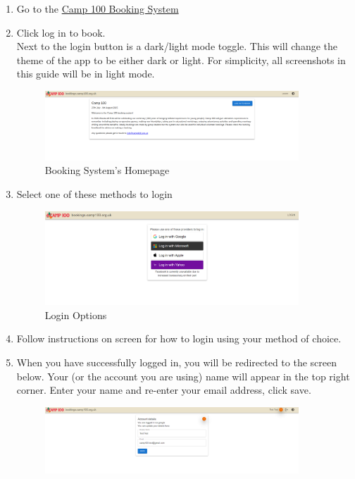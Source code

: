 \documentclass[a4paper, 11pt]{report}
\begin{document}
\begin{enumerate}
    \item Go to the \href{https://bookings.camp100.org.ukj}{Camp 100 Booking System}
    \item Click log in to book.\\
    Next to the login button is a dark/light mode toggle. This will change the theme of the app to be either dark or light. For simplicity, all screenshots in this guide will be in light mode.
    \begin{figure}[H]
        \centering
        \includegraphics[width=0.9\textwidth]{assets/1-homepage.png}
        \caption{Booking System's Homepage}
    \end{figure}
    \item Select one of these methods to login
    \begin{figure}[H]
        \centering
        \includegraphics[width=0.9\textwidth]{assets/1-login.png}
        \caption{Login Options}
    \end{figure}
    \item Follow instructions on screen for how to login using your method of choice.
    \item When you have successfully logged in, you will be redirected to the screen below. Your (or the account you are using) name will appear in the top right corner. Enter your name and re-enter your email address, click save.
    \begin{figure}[H]
        \centering
        \includegraphics[width=0.9\textwidth]{assets/1-create-account.png}

\end{figure}
\end{enumerate}
\end{document}
